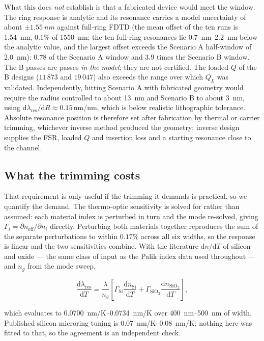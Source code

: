 \documentclass[11pt]{article}
\newcommand{\lres}{\lambda_{\mathrm{res}}}
\newcommand{\QL}{Q_L}
\begin{document}
What this does \emph{not} establish is that a fabricated device would meet the window. The ring response is analytic and its resonance carries a model uncertainty of about $\pm\SI{1.55}{nm}$ against full-ring FDTD (the mean offset of the ten runs is \SI{1.54}{nm}, $0.1\%$ of \SI{1550}{nm}; the ten full-ring resonances lie \SIrange{0.7}{2.2}{nm} below the analytic value, and the largest offset exceeds the Scenario A half-window of \SI{2.0}{nm}): $0.78$ of the Scenario A window and $3.9$ times the Scenario B window. The B passes are passes \emph{in the model}; they are not certified. The loaded $Q$ of the B designs ($11\,873$ and $19\,047$) also exceeds the range over which $\QL$ was validated. Independently, hitting Scenario A with fabricated geometry would require the radius controlled to about \SI{13}{nm} and Scenario B to about \SI{3}{nm}, using $\mathrm{d}\lres/\mathrm{d}R \approx 0.15$\,nm/nm, which is below realistic lithographic tolerance. Absolute resonance position is therefore set after fabrication by thermal or carrier trimming, whichever inverse method produced the geometry; inverse design supplies the FSR, loaded $Q$ and insertion loss and a starting resonance close to the channel.

\subsection{What the trimming costs}
\label{sec:trim}

That requirement is only useful if the trimming it demands is practical, so
we quantify the demand. The thermo-optic sensitivity is solved for rather than
assumed: each material index is perturbed in turn and the mode re-solved,
giving $\Gamma_i = \partial n_{\mathrm{eff}} / \partial n_i$ directly.
Perturbing both materials together reproduces the sum of the separate
perturbations to within $0.17\%$ across all six widths, so the response is
linear and the two sensitivities combine. With the literature
$\mathrm{d}n/\mathrm{d}T$ of silicon and oxide --- the same class of input as
the Palik index data used throughout --- and $n_g$ from the mode sweep,

\begin{equation}
\frac{\mathrm{d}\lres}{\mathrm{d}T}
= \frac{\lambda}{n_g}\left[\Gamma_{\mathrm{Si}}
\frac{\mathrm{d}n_{\mathrm{Si}}}{\mathrm{d}T}
+ \Gamma_{\mathrm{SiO_2}}
\frac{\mathrm{d}n_{\mathrm{SiO_2}}}{\mathrm{d}T}\right],
\end{equation}

which evaluates to \SIrange{0.0700}{0.0734}{nm/K} over
\SIrange{400}{500}{nm} of width. Published silicon microring tuning is
\SIrange{0.07}{0.08}{nm/K}; nothing here was fitted to that, so the agreement
is an independent check.
\end{document}
